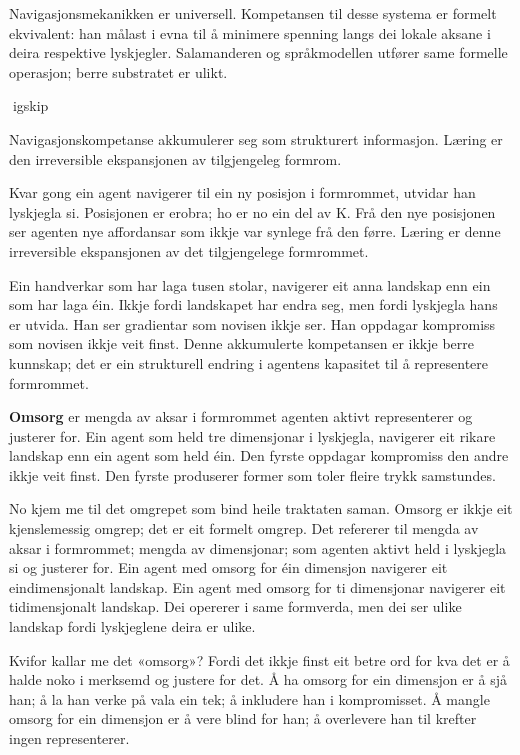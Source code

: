 Navigasjonsmekanikken er universell. Kompetansen til desse systema er formelt ekvivalent: han målast i evna til å minimere spenning langs dei lokale aksane i deira respektive lyskjegler. Salamanderen og språkmodellen utfører same formelle operasjon; berre substratet er ulikt.

igskip

Navigasjonskompetanse akkumulerer seg som strukturert informasjon. Læring er den irreversible ekspansjonen av tilgjengeleg formrom.

Kvar gong ein agent navigerer til ein ny posisjon i formrommet, utvidar han lyskjegla si. Posisjonen er erobra; ho er no ein del av K. Frå den nye posisjonen ser agenten nye affordansar som ikkje var synlege frå den førre. Læring er denne irreversible ekspansjonen av det tilgjengelege formrommet.

Ein handverkar som har laga tusen stolar, navigerer eit anna landskap enn ein som har laga éin. Ikkje fordi landskapet har endra seg, men fordi lyskjegla hans er utvida. Han ser gradientar som novisen ikkje ser. Han oppdagar kompromiss som novisen ikkje veit finst. Denne akkumulerte kompetansen er ikkje berre kunnskap; det er ein strukturell endring i agentens kapasitet til å representere formrommet.

\textbf{Omsorg} er mengda av aksar i formrommet agenten aktivt representerer og justerer for. Ein agent som held tre dimensjonar i lyskjegla, navigerer eit rikare landskap enn ein agent som held éin. Den fyrste oppdagar kompromiss den andre ikkje veit finst. Den fyrste produserer former som toler fleire trykk samstundes.

No kjem me til det omgrepet som bind heile traktaten saman. Omsorg er ikkje eit kjenslemessig omgrep; det er eit formelt omgrep. Det refererer til mengda av aksar i formrommet; mengda av dimensjonar; som agenten aktivt held i lyskjegla si og justerer for. Ein agent med omsorg for éin dimensjon navigerer eit eindimensjonalt landskap. Ein agent med omsorg for ti dimensjonar navigerer eit tidimensjonalt landskap. Dei opererer i same formverda, men dei ser ulike landskap fordi lyskjeglene deira er ulike.

Kvifor kallar me det «omsorg»? Fordi det ikkje finst eit betre ord for kva det er å halde noko i merksemd og justere for det. Å ha omsorg for ein dimensjon er å sjå han; å la han verke på vala ein tek; å inkludere han i kompromisset. Å mangle omsorg for ein dimensjon er å vere blind for han; å overlevere han til krefter ingen representerer.

